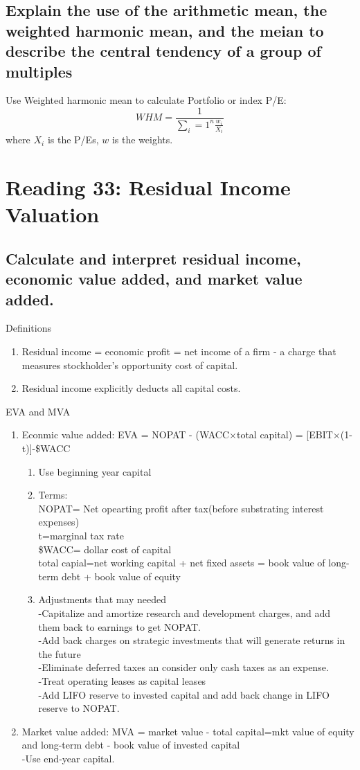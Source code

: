 \documentclass{article}
\newcommand{\be}{\begin{enumerate}}
\newcommand{\ee}{\end{enumerate}}
\begin{document}
\subsection{Explain the use of the arithmetic mean, the weighted harmonic mean,
and the meian to describe the central tendency of a group of multiples}
Use Weighted harmonic mean to calculate Portfolio or index P/E:
$$
WHM = \frac{1}{\sum_i=1^n \frac{w_i}{X_i}}
$$
where $X_i$ is the P/Es, $w$ is the weights.


\section{Reading 33: Residual Income Valuation}
\subsection{Calculate and interpret residual income, economic value added, and market
value added.}
Definitions 
\be
    \item Residual income = economic profit = net income of a firm - a charge that measures stockholder's
opportunity cost of capital.
    \item Residual income explicitly deducts all capital costs.
\ee
EVA and MVA
\be
    \item Econmic value added: EVA = NOPAT - (WACC$\times$total capital) = [EBIT$\times$(1-t)]-\$WACC
        \be
            \item Use beginning year capital
            \item Terms:
                \\NOPAT= Net opearting profit after tax(before substrating interest expenses)
                \\t=marginal tax rate
                \\ \$WACC= dollar cost of capital
                \\ total capial=net working capital + net fixed assets
                    = book value of long-term debt + book value of equity
            \item Adjustments that may needed
                \\-Capitalize and amortize research and development charges, and add them
                back to earnings to get NOPAT.
                \\-Add back charges on strategic investments that will generate returns in the future
                \\-Eliminate deferred taxes an consider only cash taxes as an expense.
                \\-Treat operating leases as capital leases
                \\-Add LIFO reserve to invested capital and add back change in LIFO reserve to 
                NOPAT.
        \ee
    \item Market value added: MVA = market value - total capital=mkt value of 
        equity and long-term debt - book value of invested capital
        \\-Use end-year capital.
\ee
\end{document}
